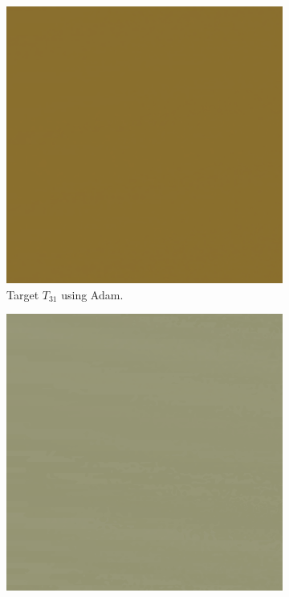 \begin{figure}
\centering
\begin{subfigure}[t]{.25\textwidth}
    \centering
    \includegraphics[width=\linewidth]{img/evaluation/M3/2 param/MSE_Adam_2_param_final.png}
    \caption{Target $T_{31}$ using Adam.}
    \label{fig:M3MSEFinalRendersTwoParamAdam}
\end{subfigure}\hspace{0.7cm}
\begin{subfigure}[t]{.25\textwidth}
    \centering
    \includegraphics[width=\linewidth]{img/evaluation/M3/random/MSE_Adam_random_final.png}

\end{subfigure}
\end{figure}
